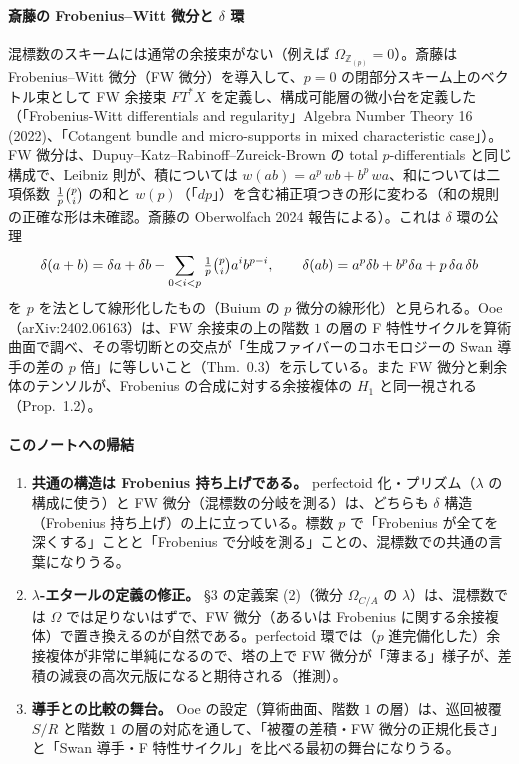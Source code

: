 \documentclass[11pt,a4paper]{ltjsarticle}
\theoremstyle{plain}
\theoremstyle{definition}
\theoremstyle{remark}
\theoremstyle{plain}
\begin{document}
\paragraph{斎藤の Frobenius--Witt 微分と $\delta$ 環}
混標数のスキームには通常の余接束がない（例えば $\Omega_{\mathbb{Z}_{(p)}} = 0$）。斎藤は Frobenius--Witt 微分（FW 微分）を導入して、$p = 0$ の閉部分スキーム上のベクトル束として FW 余接束 $FT^*X$ を定義し、構成可能層の微小台を定義した（「Frobenius-Witt differentials and regularity」Algebra Number Theory 16 (2022)、「Cotangent bundle and micro-supports in mixed characteristic case」）。FW 微分は、Dupuy--Katz--Rabinoff--Zureick-Brown の total $p$-differentials と同じ構成で、Leibniz 則が、積については $w(ab) = a^p\,wb + b^p\,wa$、和については二項係数 $\tfrac{1}{p}\tbinom{p}{i}$ の和と $w(p)$（「$dp$」）を含む補正項つきの形に変わる（和の規則の正確な形は未確認。斎藤の Oberwolfach 2024 報告による）。これは $\delta$ 環の公理
\[
  \delta(a+b) = \delta a+\delta b-\sum_{0<i<p}\tfrac{1}{p}\tbinom{p}{i}a^ib^{p-i},\qquad \delta(ab) = a^p\delta b+b^p\delta a+p\,\delta a\,\delta b
\]
を $p$ を法として線形化したもの（Buium の $p$ 微分の線形化）と見られる。Ooe（arXiv:2402.06163）は、FW 余接束の上の階数 $1$ の層の F 特性サイクルを算術曲面で調べ、その零切断との交点が「生成ファイバーのコホモロジーの Swan 導手の差の $p$ 倍」に等しいこと（Thm.~0.3）を示している。また FW 微分と剰余体のテンソルが、Frobenius の合成に対する余接複体の $H_1$ と同一視される（Prop.~1.2）。

\paragraph{このノートへの帰結}
\begin{enumerate}
  \item \textbf{共通の構造は Frobenius 持ち上げである。} perfectoid 化・プリズム（$\lambda$ の構成に使う）と FW 微分（混標数の分岐を測る）は、どちらも $\delta$ 構造（Frobenius 持ち上げ）の上に立っている。標数 $p$ で「Frobenius が全てを深くする」ことと「Frobenius で分岐を測る」ことの、混標数での共通の言葉になりうる。
  \item \textbf{$\lambda$-エタールの定義の修正。} \S 3 の定義案 (2)（微分 $\Omega_{C/A}$ の $\lambda$）は、混標数では $\Omega$ では足りないはずで、FW 微分（あるいは Frobenius に関する余接複体）で置き換えるのが自然である。perfectoid 環では（$p$ 進完備化した）余接複体が非常に単純になるので、塔の上で FW 微分が「薄まる」様子が、差積の減衰の高次元版になると期待される（推測）。
  \item \textbf{導手との比較の舞台。} Ooe の設定（算術曲面、階数 $1$ の層）は、巡回被覆 $S/R$ と階数 $1$ の層の対応を通して、「被覆の差積・FW 微分の正規化長さ」と「Swan 導手・F 特性サイクル」を比べる最初の舞台になりうる。
\end{enumerate}
\end{document}
